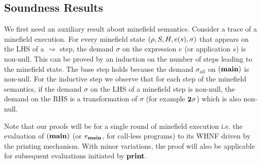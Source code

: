 \documentclass[preprint,9pt]{sigplanconf}
\newcommand{\bang}{\mbox{\sc bang}}
\begin{document}
 
\subsection{Soundness Results}


We first need an auxiliary  result about minefield semantics. Consider
a trace of  a minefield execution.  For every  minefield state $(\rho,
S,   H,  e(s),   \sigma)$   that   appears  on   the   LHS  of   a
$\rightsquigarrow$ step, the demand $\sigma$ on the expression $e$ (or
application $s$) is  non-null.  This can be proved by  an induction on
the number  of steps leading  to the  minefield state.  The  base step
holds   because  the   demand   $\sigma_{all}$   on  $(\mathbf{main})$   is
non-null. For the inductive step we  observe that for each step of the
minefield semantics, if the demand $\sigma$  on the LHS of a minefield
step  is non-null,  the  demand  on the  RHS  is  a transformation  of
$\sigma$ (for example ${\mathbf{2}}\sigma$) which is also non-null.


Note that our proofs will be for a single round of minefield execution
i.e.  the evaluation of $(\mathbf{main})$ (or $e_{\mathbf{main}}$, for call-less
programs) to  its WHNF driven  by the printing mechanism.   With minor
variations,  the   proof  will  also  be   applicable  for  subsequent
evaluations initiated by $\mathbf{print}$.
\end{document}
